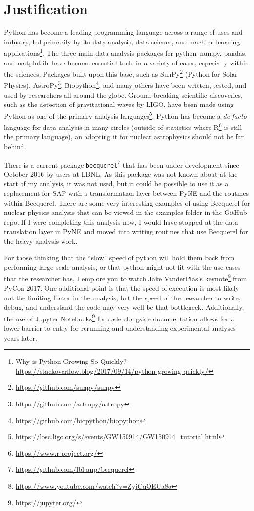 \section{Justification}

Python has become a leading programming language across a range of uses
and industry, led primarily by its data analysis, data science, and
machine learning applications\footnote{Why is Python Growing So Quickly?
\url{https://stackoverflow.blog/2017/09/14/python-growing-quickly/}}.
The three main data analysis packages for python\---{}numpy, pandas, and
matplotlib\---{}have become essential tools in a variety of cases,
especially within the sciences. Packages built upon this base, such as
SunPy\footnote{\url{https://github.com/sunpy/sunpy}} (Python for Solar
Physics), AstroPy\footnote{\url{https://github.com/astropy/astropy}},
Biopython\footnote{\url{https://github.com/biopython/biopython}}, and
many others have been written, tested, and used by researchers all
around the globe. Ground-breaking scientific discoveries, such as the
detection of gravitational waves by LIGO, have been made using Python
as one of the primary analysis
languages\footnote{\url{https://losc.ligo.org/s/events/GW150914/GW150914_tutorial.html}}.
Python has become a \emph{de facto} language for data analysis in many
circles (outside of statistics where
R\footnote{\url{https://www.r-project.org/}} is still the primary
language), an adopting it for nuclear astrophysics should not be far
behind.

There is a current package
\verb+becquerel+\footnote{\url{https://github.com/lbl-anp/becquerel}}
that has been under development since October 2016 by users at LBNL. As
this package was not known about at the start of my analysis, it was not
used, but it could be possible to use it as a replacement for SAP with
a transformation layer between PyNE and the routines within Becquerel.
There are some very interesting examples of using Becquerel for nuclear
physics analysis that can be viewed in the examples folder in the GitHub
repo. If I were completing this analysis now, I would have stopped at
the data translation layer in PyNE and moved into writing routines that
use Becquerel for the heavy analysis work.

For those thinking that the ``slow'' speed of python will hold them back
from performing large-scale analysis, or that python might not fit with
the use cases that the researcher has, I emplore you to watch Jake
VanderPlas's
keynote\footnote{\url{https://www.youtube.com/watch?v=ZyjCqQEUa8o}} from
PyCon 2017. One additional point is that the speed of execution is most
likely not the limiting factor in the analysis, but the speed of the
researcher to write, debug, and understand the code may very well be
that bottleneck. Additionally, the use of Jupyter
Notebooks\footnote{\url{https://jupyter.org/}} for code alongside
documentation allows for a lower barrier to entry for rerunning and
understanding experimental analyses years later.

